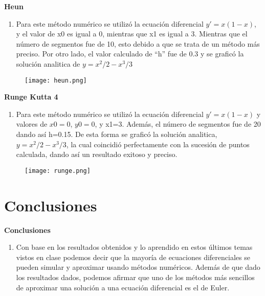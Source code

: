 \documentclass{beamer}
\begin{document}
\begin{frame}
	\textbf{Heun}
	\begin{enumerate}
		\item
			Para este método numérico se utilizó la ecuación diferencial $y'=x(1-x)$, y el valor de x0 es igual a 0, mientras que x1 es igual a 3. Mientras que el número de segmentos fue de 10, esto debido a que se trata de un método más preciso. Por otro lado, el valor calculado de “h” fue de 0.3 y se graficó la solución analitica de $y=x^2/2 - x^3/3$
	\end{enumerate} 
	\begin{figure}[H]
		\centering
		\texttt{[image: heun.png]}
		\label{fig: Figura6}
	\end{figure}
\end{frame}

\begin{frame}
	\textbf{Runge Kutta 4}
	\begin{enumerate}
		\item
Para este método numérico se utilizó la ecuación diferencial $y'=x(1-x)$ y valores de $x0=0$, $y0=0$, y x1=3. Además, el número de segmentos fue de 20 dando así h=0.15. De esta forma se graficó la solución analitica, $y=x^2/2 - x^3/3$, la cual coincidió perfectamente con la sucesión de puntos calculada, dando así un resultado exitoso y preciso.
	\end{enumerate} 
	\begin{figure}[H]
		\centering
		\texttt{[image: runge.png]}
		\label{fig: Figura3}
	\end{figure}
\end{frame}

\section{Conclusiones }

\begin{frame}
	\textbf{Conclusiones}
	\begin{enumerate}
		\item
			Con base en los resultados obtenidos y lo aprendido en estos últimos temas vistos en clase podemos decir que la mayoría de ecuaciones diferenciales se pueden simular y aproximar usando métodos numéricos. Además de que dado los resultados dados, podemos afirmar que uno de los métodos más sencillos de aproximar una solución a una ecuación diferencial es el de Euler. 
	\end{enumerate} 
\end{frame}
\end{document}
